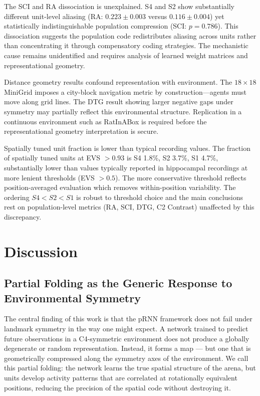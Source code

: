 \documentclass[11pt, a4paper]{article}
\begin{document}
The SCI and RA dissociation is unexplained. S4 and S2 show substantially different unit-level aliasing (RA: $0.223 \pm 0.003$ versus $0.116 \pm 0.004$) yet statistically indistinguishable population compression (SCI: $p = 0.786$). This dissociation suggests the population code redistributes aliasing across units rather than concentrating it through compensatory coding strategies. The mechanistic cause remains unidentified and requires analysis of learned weight matrices and representational geometry.

Distance geometry results confound representation with environment. The $18 \times 18$ MiniGrid imposes a city-block navigation metric by construction---agents must move along grid lines. The DTG result showing larger negative gaps under symmetry may partially reflect this environmental structure. Replication in a continuous environment such as RatInABox is required before the representational geometry interpretation is secure.

Spatially tuned unit fraction is lower than typical recording values. The fraction of spatially tuned units at EVS $> 0.93$ is S4 1.8\%, S2 3.7\%, S1 4.7\%, substantially lower than values typically reported in hippocampal recordings at more lenient thresholds (EVS $> 0.5$). The more conservative threshold reflects position-averaged evaluation which removes within-position variability. The ordering $S4 < S2 < S1$ is robust to threshold choice and the main conclusions rest on population-level metrics (RA, SCI, DTG, C2 Contrast) unaffected by this discrepancy.



\section{Discussion}
\label{sec:discussion}

\subsection{Partial Folding as the Generic Response to Environmental Symmetry}

The central finding of this work is that the pRNN framework does not fail
under landmark symmetry in the way one might expect. A network trained to
predict future observations in a C4-symmetric environment does not produce
a globally degenerate or random representation. Instead, it forms a map
--- but one that is geometrically compressed along the symmetry axes of
the environment. We call this partial folding: the network learns the true
spatial structure of the arena, but units develop activity patterns that
are correlated at rotationally equivalent positions, reducing the
precision of the spatial code without destroying it.
\end{document}
